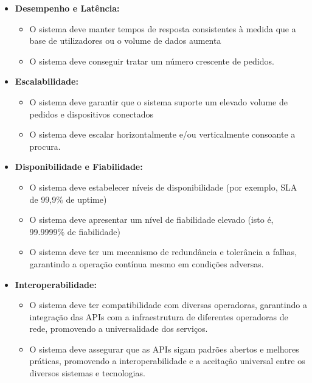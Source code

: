 \begin{itemize} \item \textbf{Desempenho e Latência:} \begin{itemize} \item O
		            sistema deve manter tempos de resposta consistentes à medida que a base de
		            utilizadores ou o volume de dados aumenta \item O sistema deve conseguir
		            tratar um número crescente de pedidos. \end{itemize}

	\item \textbf{Escalabilidade:} \begin{itemize} \item O sistema deve
		            garantir que o sistema suporte um elevado volume de pedidos e
		            dispositivos conectados \item O sistema deve escalar horizontalmente
		            e/ou verticalmente consoante a procura. \end{itemize}

	\item \textbf{Disponibilidade e Fiabilidade:} \begin{itemize} \item O
		            sistema deve estabelecer níveis de disponibilidade (por exemplo, SLA
		            de 99,9\% de uptime) \item O sistema deve apresentar um nível de
		            fiabilidade elevado (isto é, 99.9999\% de fiabilidade) \item O
		            sistema deve ter um mecanismo de redundância e tolerância a falhas,
		            garantindo a operação contínua mesmo em condições adversas. \end{itemize}
	\item  \textbf{Interoperabilidade:} \begin{itemize} \item O sistema deve ter
		            compatibilidade com diversas operadoras, garantindo a integração das APIs
		            com a infraestrutura de diferentes operadoras de rede, promovendo a
		            universalidade dos serviços. \item O sistema deve assegurar que as APIs
		            sigam padrões abertos e melhores práticas, promovendo a interoperabilidade e a
		            aceitação universal entre os diversos sistemas e tecnologias. \end{itemize}



\end{itemize}
